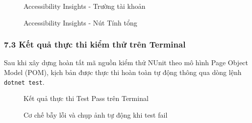 \begin{figure}[H]
\centering
\caption{Accessibility Insights - Trường tài khoản}
\end{figure}


\begin{figure}[H]
\centering
\caption{Accessibility Insights - Nút Tính tổng}
\end{figure}


\subsubsection{7.3 Kết quả thực thi kiểm thử trên Terminal}
Sau khi xây dựng hoàn tất mã nguồn kiểm thử NUnit theo mô hình Page Object Model (POM), kịch bản được thực thi hoàn toàn tự động thông qua dòng lệnh \texttt{dotnet test}.

\begin{figure}[H]
\centering
\caption{Kết quả thực thi Test Pass trên Terminal}
\end{figure}


\begin{figure}[H]
\centering
\caption{Cơ chế bẫy lỗi và chụp ảnh tự động khi test fail}
\end{figure}

